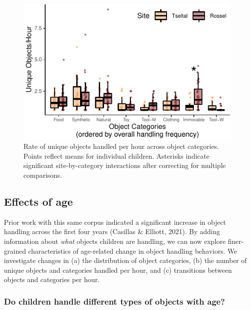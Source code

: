 \documentclass[10pt, letterpaper]{article}
\newenvironment{CodeChunk}{}{}
\begin{document}
\begin{CodeChunk}
\begin{figure}[!h]

\includegraphics{figs/overall-stats-fig-1} \hfill{}

\caption[Rate of unique objects handled per hour across object categories]{Rate of unique objects handled per hour across object categories. Points reflect means for individual children. Asterisks indicate significant site-by-category interactions after correcting for multiple comparisons.}\label{fig:overall-stats-fig}
\end{figure}
\end{CodeChunk}

\hypertarget{effects-of-age}{%
\subsection{Effects of age}\label{effects-of-age}}

Prior work with this same corpus indicated a significant increase in
object handling across the first four years (Casillas \& Elliott, 2021).
By adding information about \emph{what} objects children are handling,
we can now explore finer-grained characteristics of age-related change
in object handling behaviors. We investigate changes in (a) the
distribution of object categories, (b) the number of unique objects and
categories handled per hour, and (c) transitions between objects and
categories per hour.

\hypertarget{do-children-handle-different-types-of-objects-with-age}{%
\subsubsection{Do children handle different types of objects with
age?}\label{do-children-handle-different-types-of-objects-with-age}}
\end{document}
